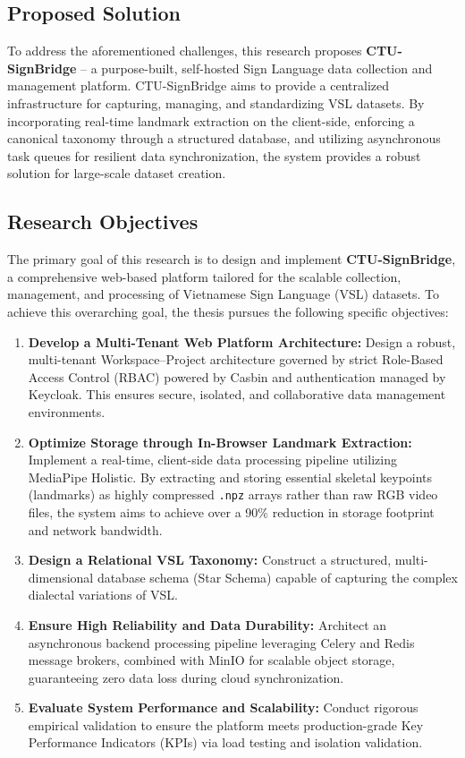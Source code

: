 \subsection{Proposed Solution}
To address the aforementioned challenges, this research proposes \textbf{CTU-SignBridge} -- a purpose-built, self-hosted Sign Language data collection and management platform. CTU-SignBridge aims to provide a centralized infrastructure for capturing, managing, and standardizing VSL datasets. By incorporating real-time landmark extraction on the client-side, enforcing a canonical taxonomy through a structured database, and utilizing asynchronous task queues for resilient data synchronization, the system provides a robust solution for large-scale dataset creation.

\subsection{Research Objectives}
The primary goal of this research is to design and implement \textbf{CTU-SignBridge}, a comprehensive web-based platform tailored for the scalable collection, management, and processing of Vietnamese Sign Language (VSL) datasets. To achieve this overarching goal, the thesis pursues the following specific objectives:

\begin{enumerate}
    \item \textbf{Develop a Multi-Tenant Web Platform Architecture:} Design a robust, multi-tenant Workspace--Project architecture governed by strict Role-Based Access Control (RBAC) powered by Casbin and authentication managed by Keycloak. This ensures secure, isolated, and collaborative data management environments.
    \item \textbf{Optimize Storage through In-Browser Landmark Extraction:} Implement a real-time, client-side data processing pipeline utilizing MediaPipe Holistic. By extracting and storing essential skeletal keypoints (landmarks) as highly compressed \texttt{.npz} arrays rather than raw RGB video files, the system aims to achieve over a 90\% reduction in storage footprint and network bandwidth.
    \item \textbf{Design a Relational VSL Taxonomy:} Construct a structured, multi-dimensional database schema (Star Schema) capable of capturing the complex dialectal variations of VSL.
    \item \textbf{Ensure High Reliability and Data Durability:} Architect an asynchronous backend processing pipeline leveraging Celery and Redis message brokers, combined with MinIO for scalable object storage, guaranteeing zero data loss during cloud synchronization.
    \item \textbf{Evaluate System Performance and Scalability:} Conduct rigorous empirical validation to ensure the platform meets production-grade Key Performance Indicators (KPIs) via load testing and isolation validation.
\end{enumerate}

